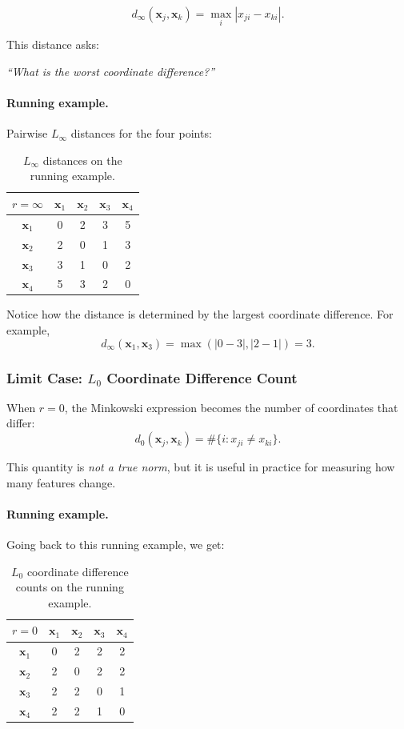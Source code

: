 \documentclass{article}
\begin{document}
\[
d_\infty(\mathbf{x}_j,\mathbf{x}_k)=
\max_i |x_{ji}-x_{ki}|.
\]

This distance asks:
\begin{center}
\emph{“What is the worst coordinate difference?”}
\end{center}

\paragraph{Running example.}
Pairwise $L_\infty$ distances for the four points:

\begin{table}[H]
\centering
\begin{tabular}{c|cccc}
\hline
$r=\infty$ & $\mathbf{x}_1$ & $\mathbf{x}_2$ & $\mathbf{x}_3$ & $\mathbf{x}_4$\\
\hline
$\mathbf{x}_1$ & 0 & 2 & 3 & 5\\
$\mathbf{x}_2$ & 2 & 0 & 1 & 3\\
$\mathbf{x}_3$ & 3 & 1 & 0 & 2\\
$\mathbf{x}_4$ & 5 & 3 & 2 & 0\\
\hline
\end{tabular}
\caption{$L_\infty$ distances on the running example.}
\end{table}

Notice how the distance is determined by the largest coordinate difference.
For example,
\[
d_\infty(\mathbf{x}_1,\mathbf{x}_3)=\max(|0-3|,|2-1|)=3.
\]

\subsubsection{Limit Case: $L_0$ Coordinate Difference Count}

When $r=0$, the Minkowski expression becomes the number of coordinates that differ:
\[
d_0(\mathbf{x}_j,\mathbf{x}_k)=
\#\{i : x_{ji}\neq x_{ki}\}.
\]

This quantity is \emph{not a true norm}, but it is useful in practice
for measuring how many features change.

\paragraph{Running example.}

Going back to this running example, we get:

\begin{table}[H]
\centering
\begin{tabular}{c|cccc}
\hline
$r=0$ & $\mathbf{x}_1$ & $\mathbf{x}_2$ & $\mathbf{x}_3$ & $\mathbf{x}_4$\\
\hline
$\mathbf{x}_1$ & 0 & 2 & 2 & 2\\
$\mathbf{x}_2$ & 2 & 0 & 2 & 2\\
$\mathbf{x}_3$ & 2 & 2 & 0 & 1\\
$\mathbf{x}_4$ & 2 & 2 & 1 & 0\\
\hline
\end{tabular}
\caption{$L_0$ coordinate difference counts on the running example.}
\end{table}
\end{document}
